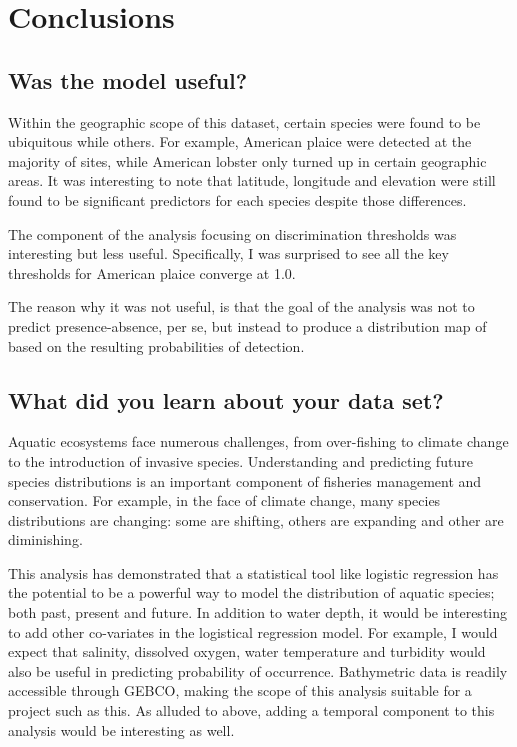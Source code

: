 \section{Conclusions}

\subsection{Was the model useful?}

Within the geographic scope of this dataset, certain species were found to be ubiquitous while others.
For example, American plaice were detected at the majority of sites, while American lobster only turned up in certain
geographic areas.
It was interesting to note that latitude, longitude and elevation were still found to be significant predictors for each
species despite those differences.

The component of the analysis focusing on discrimination thresholds was interesting but less useful.
Specifically, I was surprised to see all the key thresholds for American plaice converge at 1.0.

The reason why it was not useful, is that the goal of the analysis was not to predict presence-absence, per se, but instead
to produce a distribution map of based on the resulting probabilities of detection.


\subsection{What did you learn about your data set?}

Aquatic ecosystems face numerous challenges, from over-fishing to climate change to the introduction of invasive species.
Understanding and predicting future species distributions is an important component of fisheries management and conservation.
For example, in the face of climate change, many species distributions are changing: some are shifting, others are expanding
and other are diminishing.

This analysis has demonstrated that a statistical tool like logistic regression has the potential to be a powerful
way to model the distribution of aquatic species; both past, present and future.
In addition to water depth, it would be interesting to add other co-variates in the logistical regression model.
For example, I would expect that salinity, dissolved oxygen, water temperature and turbidity would also be useful in predicting
probability of occurrence.
Bathymetric data is readily accessible through GEBCO, making the scope of this analysis suitable for a project such as this.
As alluded to above, adding a temporal component to this analysis would be interesting as well.


